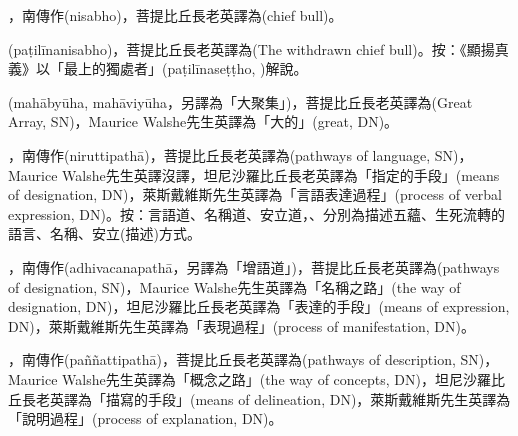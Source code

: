\startitemgroup[noteitems]
\item{}，南傳作(nisabho)，菩提比丘長老英譯為(chief bull)。
\item{}(paṭilīnanisabho)，菩提比丘長老英譯為(The withdrawn chief bull)。按：《顯揚真義》以「最上的獨處者」(paṭilīnaseṭṭho, )解說。
\stopitemgroup

\startitemgroup[noteitems]
\item{}(mahābyūha, mahāviyūha，另譯為「大聚集」)，菩提比丘長老英譯為(Great Array, SN)，Maurice Walshe先生英譯為「大的」(great, DN)。
\stopitemgroup

\startitemgroup[noteitems]
\item{}，南傳作(niruttipathā)，菩提比丘長老英譯為(pathways of language, SN)，Maurice Walshe先生英譯沒譯，坦尼沙羅比丘長老英譯為「指定的手段」(means of designation, DN)，萊斯戴維斯先生英譯為「言語表達過程」(process of verbal expression, DN)。按：言語道、名稱道、安立道，、分別為描述五蘊、生死流轉的語言、名稱、安立(描述)方式。
\stopitemgroup

\startitemgroup[noteitems]
\item{}，南傳作(adhivacanapathā，另譯為「增語道」)，菩提比丘長老英譯為(pathways of designation, SN)，Maurice Walshe先生英譯為「名稱之路」(the way of designation, DN)，坦尼沙羅比丘長老英譯為「表達的手段」(means of expression, DN)，萊斯戴維斯先生英譯為「表現過程」(process of manifestation, DN)。
\stopitemgroup

\startitemgroup[noteitems]
\item{}，南傳作(paññattipathā)，菩提比丘長老英譯為(pathways of description, SN)，Maurice Walshe先生英譯為「概念之路」(the way of concepts, DN)，坦尼沙羅比丘長老英譯為「描寫的手段」(means of delineation, DN)，萊斯戴維斯先生英譯為「說明過程」(process of explanation, DN)。
\stopitemgroup

